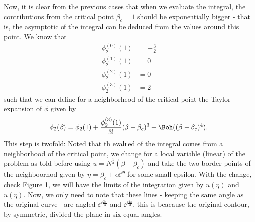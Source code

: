 Now, it is clear from the previous cases that when we evaluate the integral, the contributions from the critical point $\beta_c = 1$ should be exponentially bigger - that is, the asymptotic of the integral can be deduced from the values around this point. We know that 
\begin{align}
	\phi^{(0)}_{2}(1) & = - \frac{3}{2} \\
	\phi^{(1)}_{2}(1) & = 0\\
	\phi^{(2)}_{2}(1) & = 0\\
	\phi^{(3)}_{2}(1) & = 2
\end{align}
such that we can define for a neighborhood of the critical point the Taylor expansion of $\phi$ given by
\begin{equation}
	\phi_{2}(\beta) = \phi_{2}(1) + \frac{\phi^{(3)}_{2}(1)}{3!} (\beta - \beta_c)^3 + \Boh((\beta - \beta_c)^4).
\end{equation}
This step is twofold: Noted that th evalued of the integral comes from a neighborhood of the critical point, we change for a local variable (linear) of the problem as told before using $u = N^{\frac{1}{3}}(\beta - \beta_c)$ and take the two border points of the neighboorhod given by $\eta = \beta_c + \epsilon \ee^{\ii \theta}$ for some small epsilon. With the change, check Figure \ref{Figure: Change of local variables, Airy}, we will have the limits of the integration given by $u(\eta)$ and $u(\overline{\eta})$. Now, we only need to note that these lines - keeping the same angle as the original curve - are angled $\ee^{\ii \frac{2\pi}{3}}$ and $\ee^{\ii \frac{4\pi}{3}}$. this is beacause the original contour, by symmetric, divided the plane in six equal angles. 
\begin{figure}
	\centering
\label{Figure: Change of local variables, Airy}
\end{figure}
